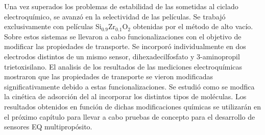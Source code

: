 	Una vez superados los problemas de estabilidad de las \pdm\space sometidas al ciclado electroquímico, se avanzó en la selectividad de las películas. Se trabajó exclusivamente con películas Si$_{0.9}$Zr$_{0.1}$O$_2$ obtenidas por el método de alto vacío. Sobre estos sistemas se llevaron a cabo funcionalizaciones con el objetivo de modificar las propiedades de transporte. Se incorporó individualmente en dos electrodos distintos de un mismo sensor, dihexadecilfosfato y 3-aminopropil trietoxisilano. El analisis de los resultados de las mediciones electroquímicas mostraron que las propiedades de transporte se vieron modificadas significativamente debido a estas funcionalizaciones. Se estudió como se modfica la cinética de adsorción del \aminorutenio\space al incorporar los distintos tipos de moléculas. Los resultados obtenidos en función de dichas modificaciones químicas se utilizarán en el próximo capítulo para llevar a cabo pruebas de concepto para el desarrollo de sensores EQ multipropósito.

